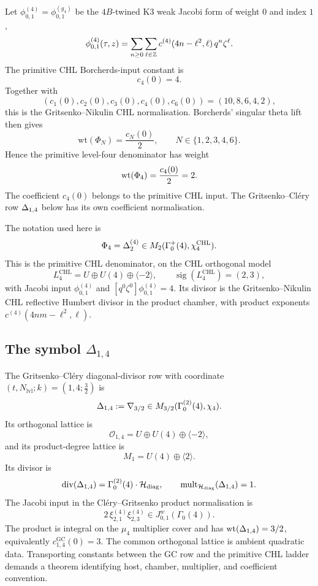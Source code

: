 Let $\phi^{(4)}_{0,1}=\phi^{(g_4)}_{0,1}$ be the $4B$-twined K3 weak
Jacobi form of weight $0$ and index $1$,
\[
  \phi^{(4)}_{0,1}(\tau,z)
  =
  \sum_{n\geq 0}\sum_{\ell\in\mathbb{Z}}
  c^{(4)}(4n-\ell^2,\ell)\,q^n\zeta^\ell .
\]
The primitive CHL Borcherds-input constant is
\[
  c_4(0)=4.
\]
Together with
\[
  (c_1(0),c_2(0),c_3(0),c_4(0),c_6(0))=(10,8,6,4,2),
\]
this is the Gritsenko--Nikulin CHL normalisation. Borcherds' singular
theta lift then gives
\[
  \mathrm{wt}(\Phi_N)=\frac{c_N(0)}2,\qquad
  N\in\{1,2,3,4,6\}.
\]
Hence the primitive level-four denominator has weight
\[
  \mathrm{wt}(\Phi_4)=\frac{c_4(0)}2=2.
\]
The coefficient $c_4(0)$ belongs to the primitive CHL input. The
Gritsenko--Cl\'ery row $\Delta_{1,4}$ below has its own coefficient
normalisation.

The notation used here is
\[
  \Phi_4=\Delta^{(4)}_2
  \in M_2(\Gamma_0^+(4),\chi^{\mathrm{CHL}}_4).
\]
This is the primitive CHL denominator, on the CHL orthogonal model
\[
  L^{\mathrm{CHL}}_4=U\oplus U(4)\oplus\langle-2\rangle,
  \qquad \operatorname{sig}(L^{\mathrm{CHL}}_4)=(2,3),
\]
with Jacobi input $\phi^{(4)}_{0,1}$ and
$[q^0\zeta^0]\phi^{(4)}_{0,1}=4$. Its divisor is the
Gritsenko--Nikulin CHL reflective Humbert divisor in the product
chamber, with product exponents $c^{(4)}(4nm-\ell^2,\ell)$.

\subsection*{The symbol $\Delta_{1,4}$}

The Gritsenko--Cl\'ery diagonal-divisor row with coordinate
$(t,N_{\mathrm{lvl}};k)=(1,4;\tfrac32)$ is
\[
  \Delta_{1,4}:=\nabla_{3/2}
  \in M_{3/2}(\Gamma_0^{(2)}(4),\chi_4).
\]
Its orthogonal lattice is
\[
  \mathcal O_{1,4}=U\oplus U(4)\oplus\langle-2\rangle,
\]
and its product-degree lattice is
\[
  M_1=U(4)\oplus\langle2\rangle.
\]
Its divisor is
\[
  \operatorname{div}(\Delta_{1,4})
  =
  \Gamma_0^{(2)}(4)\cdot\mathcal H_{\mathrm{diag}},
  \qquad
  \operatorname{mult}_{\mathcal H_{\mathrm{diag}}}(\Delta_{1,4})=1.
\]
The Jacobi input in the Cl\'ery--Gritsenko product normalisation is
\[
  2\,\xi_{2,1}^{(4)}\xi_{2,3}^{(4)}
  \in J^w_{0,1}(\Gamma_0(4)).
\]
The product is integral on the $\mu_4$ multiplier cover and has
$\operatorname{wt}(\Delta_{1,4})=3/2$, equivalently
$c^{\mathrm{GC}}_{1,4}(0)=3$. The common orthogonal lattice is ambient
quadratic data. Transporting constants between the GC row and the
primitive CHL ladder demands a theorem identifying host, chamber,
multiplier, and coefficient convention.

